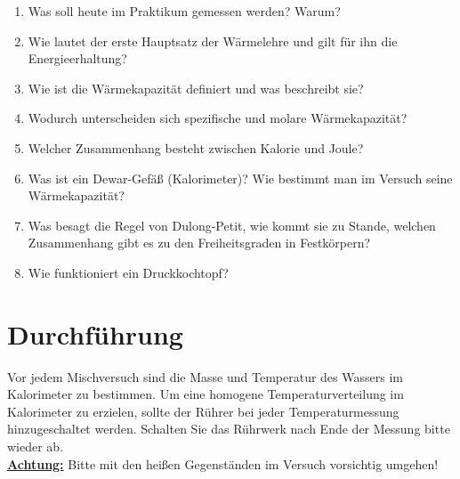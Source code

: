 \begin{enumerate} 
 \item Was soll heute im Praktikum gemessen werden? Warum?
 \item Wie lautet der erste Hauptsatz der Wärmelehre und gilt für ihn die Energieerhaltung?
 \item Wie ist die Wärmekapazität definiert und was beschreibt sie?
 \item Wodurch unterscheiden sich spezifische und molare Wärmekapazität?
 \item Welcher Zusammenhang besteht zwischen Kalorie und Joule?
 \item Was ist ein Dewar-Gefäß (Kalorimeter)? Wie bestimmt man im Versuch seine Wärmekapazität?
 \item Was besagt die Regel von Dulong-Petit, wie kommt sie zu Stande, welchen Zusammenhang gibt es zu den Freiheitsgraden in Festkörpern?
 \item Wie funktioniert ein Druckkochtopf?
\end{enumerate} 

\section{Durchführung} 

Vor jedem Mischversuch sind die Masse und Temperatur des Wassers im Kalorimeter zu bestimmen. Um eine homogene Temperaturverteilung im Kalorimeter zu erzielen, sollte der Rührer bei jeder Temperaturmessung hinzugeschaltet werden. Schalten Sie das Rührwerk nach Ende der Messung bitte wieder ab.\\

\underline{\textbf{Achtung:}} Bitte mit den heißen Gegenständen im Versuch vorsichtig umgehen!


